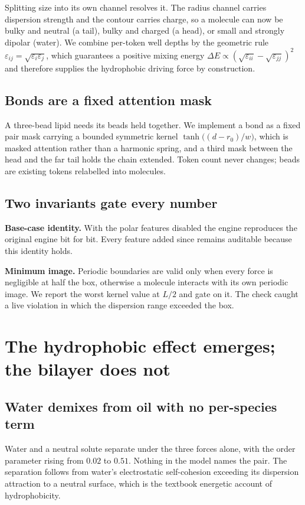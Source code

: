\documentclass[10pt,twocolumn]{article}
\begin{document}
Splitting size into its own channel resolves it. The radius channel carries dispersion strength and
the contour carries charge, so a molecule can now be bulky and neutral (a tail), bulky and charged (a
head), or small and strongly dipolar (water). We combine per-token well depths by the geometric rule
$\varepsilon_{ij} = \sqrt{\varepsilon_i \varepsilon_j}$, which guarantees a positive mixing energy
$\Delta E \propto (\sqrt{\varepsilon_{ii}}-\sqrt{\varepsilon_{jj}})^2$ and therefore supplies the
hydrophobic driving force by construction.

\subsection{Bonds are a fixed attention mask}

A three-bead lipid needs its beads held together. We implement a bond as a fixed pair mask carrying a
bounded symmetric kernel $\tanh\!\big((d-r_0)/w\big)$, which is masked attention rather than a
harmonic spring, and a third mask between the head and the far tail holds the chain extended. Token
count never changes; beads are existing tokens relabelled into molecules.

\subsection{Two invariants gate every number}

\textbf{Base-case identity.} With the polar features disabled the engine reproduces the original
engine bit for bit. Every feature added since remains auditable because this identity holds.

\textbf{Minimum image.} Periodic boundaries are valid only when every force is negligible at half the
box, otherwise a molecule interacts with its own periodic image. We report the worst kernel value at
$L/2$ and gate on it. The check caught a live violation in which the dispersion range exceeded the
box.

\section{The hydrophobic effect emerges; the bilayer does not}

\subsection{Water demixes from oil with no per-species term}

Water and a neutral solute separate under the three forces alone, with the order parameter rising
from $0.02$ to $0.51$. Nothing in the model names the pair. The separation follows from water's
electrostatic self-cohesion exceeding its dispersion attraction to a neutral surface, which is the
textbook energetic account of hydrophobicity.
\end{document}
